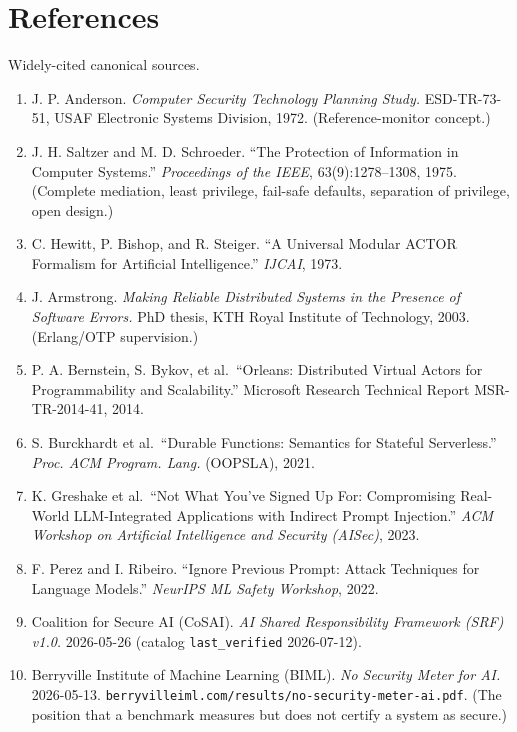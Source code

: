 \documentclass[11pt]{article}
\providecommand{\tightlist}{%
 \setlength{\itemsep}{0pt}\setlength{\parskip}{0pt}}
\begin{document}
\section*{References}\label{references}

Widely-cited canonical sources.

\begin{enumerate}
\def\labelenumi{\arabic{enumi}.}
\tightlist
\item
 J. P. Anderson. \emph{Computer Security Technology Planning Study.} ESD-TR-73-51, USAF
 Electronic Systems Division, 1972. (Reference-monitor concept.)
\item
 J. H. Saltzer and M. D. Schroeder. ``The Protection of Information in Computer Systems.''
 \emph{Proceedings of the IEEE}, 63(9):1278--1308, 1975. (Complete mediation, least privilege,
 fail-safe defaults, separation of privilege, open design.)
\item
 C. Hewitt, P. Bishop, and R. Steiger. ``A Universal Modular ACTOR Formalism for Artificial
 Intelligence.'' \emph{IJCAI}, 1973.
\item
 J. Armstrong. \emph{Making Reliable Distributed Systems in the Presence of Software Errors.}
 PhD thesis, KTH Royal Institute of Technology, 2003. (Erlang/OTP supervision.)
\item
 P. A. Bernstein, S. Bykov, et al.~``Orleans: Distributed Virtual Actors for Programmability
 and Scalability.'' Microsoft Research Technical Report MSR-TR-2014-41, 2014.
\item
 S. Burckhardt et al.~``Durable Functions: Semantics for Stateful Serverless.'' \emph{Proc. ACM
 Program. Lang.} (OOPSLA), 2021.
\item
 K. Greshake et al.~``Not What You've Signed Up For: Compromising Real-World LLM-Integrated
 Applications with Indirect Prompt Injection.'' \emph{ACM Workshop on Artificial Intelligence and
 Security (AISec)}, 2023.
\item
 F. Perez and I. Ribeiro. ``Ignore Previous Prompt: Attack Techniques for Language Models.''
 \emph{NeurIPS ML Safety Workshop}, 2022.
\item
 Coalition for Secure AI (CoSAI). \emph{AI Shared Responsibility Framework (SRF) v1.0.} 2026-05-26 (catalog
 \texttt{last\_verified} 2026-07-12).
\item
 Berryville Institute of Machine Learning (BIML). \emph{No Security Meter for AI.} 2026-05-13.
 \texttt{berryvilleiml.com/results/no-security-meter-ai.pdf}. (The position that a benchmark
 measures but does not certify a system as secure.)

\end{enumerate}
\end{document}
